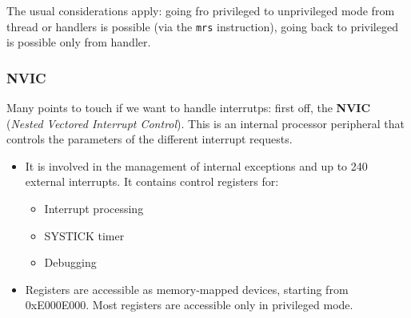 \documentclass[a4paper,11pt]{article}
\begin{document}
The usual considerations apply: going fro privileged to unprivileged mode from thread or handlers is possible (via the \texttt{mrs} instruction), going back to privileged is possible only from handler.

\subsubsection{NVIC}

Many points to touch if we want to handle interrutps: first off, the \textbf{NVIC} (\textit{Nested Vectored Interrupt Control}).
This is an internal processor peripheral that controls the parameters of the different interrupt requests.

\begin{itemize}
	\item It is involved in the management of internal exceptions and up to 240 external interrupts.
	      It contains control registers for:
	      \begin{itemize}
		      \item Interrupt processing
		      \item SYSTICK timer
		      \item Debugging
	      \end{itemize}
	\item Registers are accessible as memory-mapped devices, starting from 0xE000E000.
	      Most registers are accessible only in privileged mode.
\end{itemize}
\end{document}
